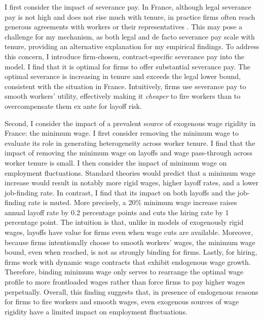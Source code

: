 I first consider the impact of severance pay. In France, although legal severance pay is not high and does not rise much with tenure, in practice firms often reach generous agreements with workers or their representatives \parencite{kramarz2010}. This may pose a challenge for my mechanism, as both legal and de facto severance pay scale with tenure, providing an alternative explanation for my empirical findings. To address this concern, I introduce firm-chosen, contract-specific severance pay into the model. I find that it is optimal for firms to offer substantial severance pay. The optimal severance is increasing in tenure and exceeds the legal lower bound, consistent with the situation in France. Intuitively, firms use severance pay to smooth workers’ utility, effectively making it \emph{cheaper} to fire workers than to overcompensate them ex ante for layoff risk. %

Second, I consider the impact of a prevalent source of exogenous wage rigidity in France: the minimum wage. I first consider removing the minimum wage to evaluate its role in generating heterogeneity across worker tenure. I find that the impact of removing the minimum wage on layoffs and wage pass-through across worker tenure is small. I then consider the impact of minimum wage on employment fluctuations. Standard theories would predict that a minimum wage increase would result in notably more rigid wages, higher layoff rates, and a lower job-finding rate. In contrast, I find that its impact on both layoffs and the job-finding rate is muted. More precisely, a 20\% minimum wage increase raises annual layoff rate by 0.2 percentage points and cuts the hiring rate by 1 percentage point. The intuition is that, unlike in models of exogenously rigid wages, layoffs have value for firms even when wage cuts are available. Moreover, because firms intentionally choose to smooth workers’ wages, the minimum wage bound, even when reached, is not as strongly binding for firms. Lastly, for hiring, firms work with dynamic wage contracts that exhibit endogenous wage growth. Therefore, binding minimum wage only serves to rearrange the optimal wage profile to more frontloaded wages rather than force firms to pay higher wages perpetually. Overall, this finding suggests that, in presence of endogenous reasons for firms to fire workers and smooth wages, even exogenous sources of wage rigidity have a limited impact on employment fluctuations.

